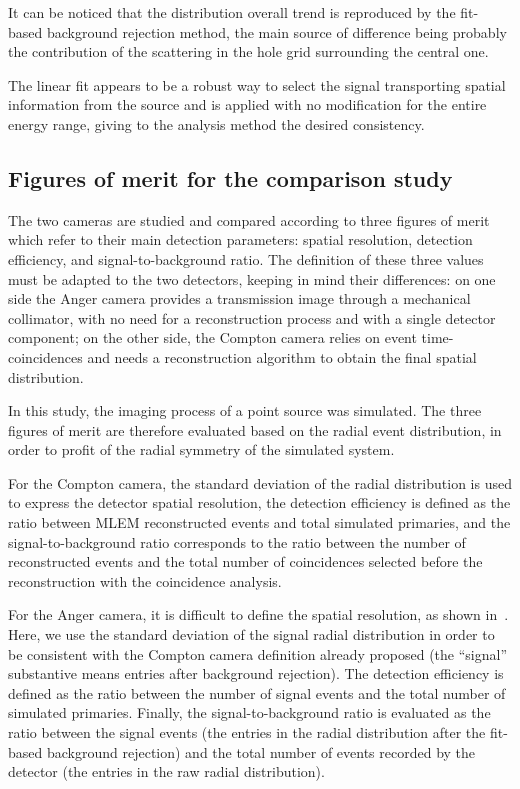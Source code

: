 It can be noticed that the distribution overall trend is reproduced by the fit-based background rejection method, the main source of difference being probably the contribution of the scattering in the hole grid surrounding the central one.

The linear fit appears to be a robust way to select the signal transporting spatial information from the source and is applied with no modification for the entire energy range, giving to the analysis method the desired consistency.

\subsection{Figures of merit for the comparison study}\label{fom}

The two cameras are studied and compared according to three figures of merit which refer to their main detection parameters: spatial resolution, detection efficiency, and signal-to-background ratio. The definition of these three values must be adapted to the two detectors, keeping in mind their differences: on one side the Anger camera provides a transmission image through a mechanical collimator, with no need for a reconstruction process and with a single detector component; on the other side, the Compton camera relies on event time-coincidences and needs a reconstruction algorithm to obtain the final spatial distribution.

In this study, the imaging process of a point source was simulated. The three figures of merit are therefore evaluated based on the radial event distribution, in order to profit of the radial symmetry of the simulated system.

For the Compton camera, the standard deviation of the radial distribution is used to express the detector spatial resolution, the detection efficiency is defined as the ratio between MLEM reconstructed events and total simulated primaries, and the signal-to-background ratio corresponds to the ratio between the number of reconstructed events and the total number of coincidences selected before the reconstruction with the coincidence analysis.

For the Anger camera, it is difficult to define the spatial resolution, as shown in~\cite{CecchinFWHManger}. Here, we use the standard deviation of the signal radial distribution in order to be consistent with the Compton camera definition already proposed (the ``signal'' substantive means entries after background rejection). The detection efficiency is defined as the ratio between the number of signal events and the total number of simulated primaries. Finally, the signal-to-background ratio is evaluated as the ratio between the signal events (the entries in the radial distribution after the fit-based background rejection) and the total number of events recorded by the detector (the entries in the raw radial distribution).

